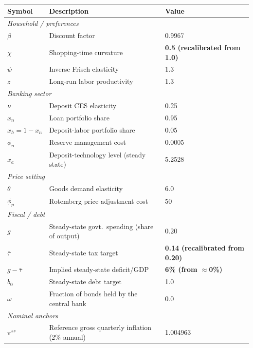 \documentclass[11pt]{article}
\begin{document}
\begin{table}[htbp]
\centering
\small
\begin{tabular}{lll}
\toprule
Symbol & Description & Value \\
\midrule
\multicolumn{3}{l}{\textit{Household / preferences}} \\
$\beta$      & Discount factor                         & 0.9967 \\
$\chi$       & Shopping-time curvature                 & \textbf{0.5 (recalibrated from 1.0)} \\
$\psi$       & Inverse Frisch elasticity                & 1.3 \\
$z$          & Long-run labor productivity              & 1.3 \\
\midrule
\multicolumn{3}{l}{\textit{Banking sector}} \\
$\nu$        & Deposit CES elasticity                   & 0.25 \\
$x_n$        & Loan portfolio share                     & 0.95 \\
$x_h=1-x_n$  & Deposit-labor portfolio share             & 0.05 \\
$\phi_n$     & Reserve management cost                  & 0.0005 \\
$x_a$        & Deposit-technology level (steady state)  & 5.2528 \\
\midrule
\multicolumn{3}{l}{\textit{Price setting}} \\
$\theta$     & Goods demand elasticity                  & 6.0 \\
$\phi_p$     & Rotemberg price-adjustment cost           & 50 \\
\midrule
\multicolumn{3}{l}{\textit{Fiscal / debt}} \\
$g$          & Steady-state govt.\ spending (share of output) & 0.20 \\
$\bar\tau$   & Steady-state tax target                  & \textbf{0.14 (recalibrated from 0.20)} \\
$g-\bar\tau$ & Implied steady-state deficit/GDP         & \textbf{6\% (from $\approx$0\%)} \\
$b_0$        & Steady-state debt target                 & 1.0 \\
$\omega$     & Fraction of bonds held by the central bank & 0.0 \\
\midrule
\multicolumn{3}{l}{\textit{Nominal anchors}} \\
$\pi^{ss}$   & Reference gross quarterly inflation (2\% annual) & 1.004963 \\

\end{tabular}
\end{table}
\end{document}
